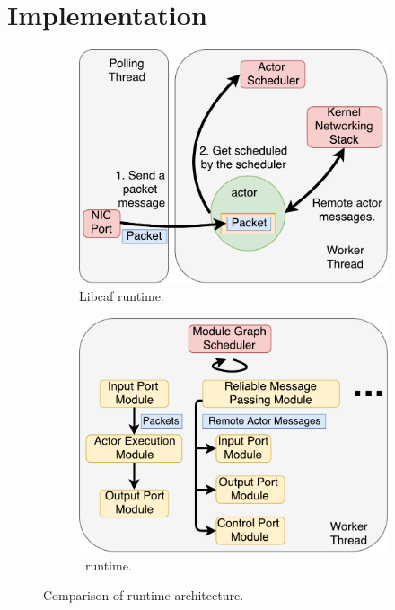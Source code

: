 \section{Implementation}
 \label{sec:implementation}

\begin{figure}[!h]
\begin{subfigure}[t]{0.49\linewidth}
   \centering
   \includegraphics[width=\columnwidth]{chap-nfvactor/figure/actor-scheduling.pdf}
   \caption{Libcaf runtime.}\label{fig:actor-schedule}
  \end{subfigure}
  \begin{subfigure}[t]{0.49\linewidth}
     \centering
     \includegraphics[width=\columnwidth]{chap-nfvactor/figure/graph-scheduling.pdf}
     \caption{\nfactor~runtime.}\label{fig:graph-schedule}
    \end{subfigure}
 \caption{Comparison of runtime architecture.}
\label{fig:two-versions}
\end{figure}

